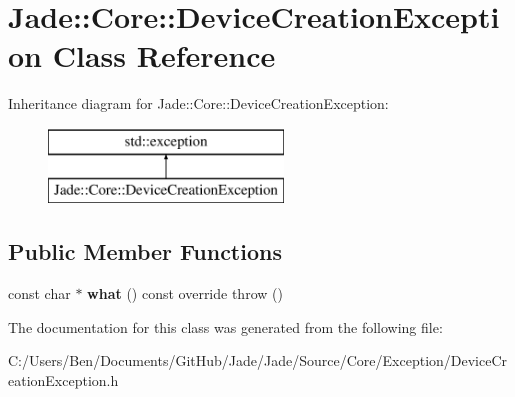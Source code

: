 \hypertarget{class_jade_1_1_core_1_1_device_creation_exception}{}\section{Jade\+:\+:Core\+:\+:Device\+Creation\+Exception Class Reference}
\label{class_jade_1_1_core_1_1_device_creation_exception}
Inheritance diagram for Jade\+:\+:Core\+:\+:Device\+Creation\+Exception\+:\begin{figure}[H]
\begin{center}
\leavevmode
\includegraphics[height=2.000000cm]{class_jade_1_1_core_1_1_device_creation_exception}
\end{center}
\end{figure}
\subsection*{Public Member Functions}
\begin{DoxyCompactItemize}
\item 
\hypertarget{class_jade_1_1_core_1_1_device_creation_exception_a7cd301967a6f371f22028d7545997193}{}const char $\ast$ {\bfseries what} () const  override  throw ()\label{class_jade_1_1_core_1_1_device_creation_exception_a7cd301967a6f371f22028d7545997193}

\end{DoxyCompactItemize}


The documentation for this class was generated from the following file\+:\begin{DoxyCompactItemize}
\item 
C\+:/\+Users/\+Ben/\+Documents/\+Git\+Hub/\+Jade/\+Jade/\+Source/\+Core/\+Exception/Device\+Creation\+Exception.\+h\end{DoxyCompactItemize}
